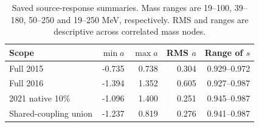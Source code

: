 \begin{table}[H]\centering\small
\begin{tabular}{lrrrr}\toprule
Scope & $\min a$ & $\max a$ & RMS $a$ & Range of $s$\\\midrule
Full 2015 & -0.735 & 0.738 & 0.304 & 0.929--0.972\\
Full 2016 & -1.394 & 1.352 & 0.605 & 0.927--0.987\\
2021 native 10\% & -1.096 & 1.400 & 0.251 & 0.945--0.987\\
Shared-coupling union & -1.237 & 0.819 & 0.276 & 0.941--0.987\\
\bottomrule\end{tabular}
\caption{Saved source-response summaries. Mass ranges are 19--100, 39--180, 50--250 and 19--250 MeV, respectively. RMS and ranges are descriptive across correlated mass nodes.}\end{table}
